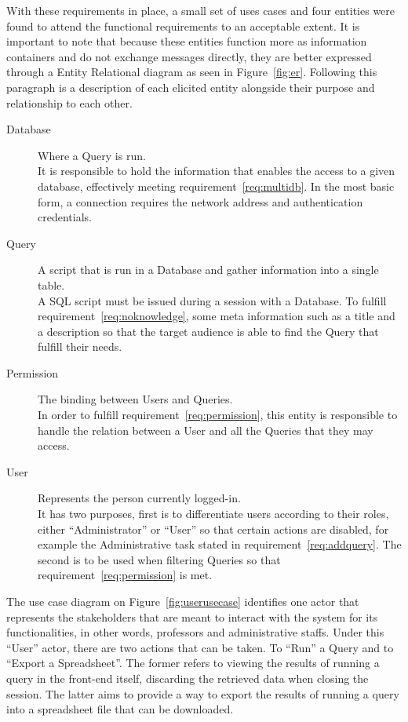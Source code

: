 With these requirements in place, a small set of uses cases and four entities were found to attend the functional requirements to an acceptable extent.
It is important to note that because these entities function more as information containers and do not exchange messages directly, they are better expressed through a Entity Relational diagram as seen in Figure~\ref{fig:er}.
Following this paragraph is a description of each elicited entity alongside their purpose and relationship to each other.

\begin{description}
\item[Database] Where a Query is run.\\
  It is responsible to hold the information that enables the access to a given database, effectively meeting requirement~\ref{req:multidb}.
  In the most basic form, a connection requires the network address and authentication credentials.
\item[Query] A script that is run in a Database and gather information into a single table.\label{model:query}\\
  A \gls{SQL} script must be issued during a session with a Database.
  To fulfill requirement~\ref{req:noknowledge}, some meta information such as a title and a description so that the target audience is able to find the Query that fulfill their needs.
\item[Permission] The binding between Users and Queries.\\
  In order to fulfill requirement~\ref{req:permission}, this entity is responsible to handle the relation between a User and all the Queries that they may access.
\item[User] Represents the person currently logged-in.\\
  It has two purposes, first is to differentiate users according to their roles, either ``Administrator'' or ``User'' so that certain actions are disabled, for example the Administrative task stated in requirement~\ref{req:addquery}.
  The second is to be used when filtering Queries so that requirement~\ref{req:permission} is met.
\end{description}

The use case diagram on Figure~\ref{fig:userusecase} identifies one actor that represents the stakeholders that are meant to interact with the system for its functionalities, in other words,  professors and administrative staffs. Under this ``User'' actor, there are two actions that can be taken. To ``Run'' a Query and to ``Export a Spreadsheet''. The former refers to viewing the results of running a query in the front-end itself, discarding the retrieved data when closing the session. The latter aims to provide a way to export the results of running a query into a spreadsheet file that can be downloaded.

